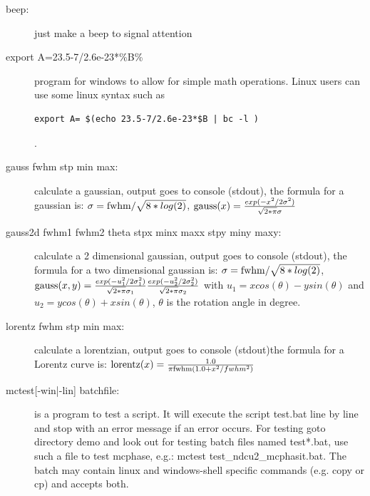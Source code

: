 \begin{description}
\item [\prg beep:] just make a beep to signal attention 
\item [\prg export A=23.5-7/2.6e-23*\%B\%] program for windows to allow for
simple math operations. Linux users can use some linux syntax such as 
{\prg \begin{verbatim}export A= $(echo 23.5-7/2.6e-23*$B | bc -l )\end{verbatim}}.
\item [\prg gauss\label{gauss} fwhm stp min max:] calculate a gaussian, output goes to console %
(stdout), the formula for a gaussian is:
$\sigma={\rm fwhm}/\sqrt{8*log(2)}$,
${\rm gauss}(x)=\frac{exp(-x^2/2 \sigma^2)}{\sqrt{2*\pi}\sigma}$
\item [\prg gauss2d\label{gauss2d} fwhm1 fwhm2 theta  stpx minx maxx stpy miny maxy:] calculate a 2 dimensional gaussian, output goes to console %
(stdout), the formula for a two dimensional gaussian is:
$\sigma={\rm fwhm}/\sqrt{8*log(2)}$,
${\rm gauss}(x,y)=\frac{exp(-u_1^2/2 \sigma_1^2)}{\sqrt{2*\pi}\sigma_1}\frac{exp(-u_2^2/2 \sigma_2^2)}{\sqrt{2*\pi}\sigma_2}$ with $u_1=x cos(\theta)-ysin(\theta)$ and $u_2=y cos(\theta)+xsin(\theta)$,
$\theta$ is the rotation angle in degree.
\item [\prg lorentz\label{lorentz} fwhm stp min max:] calculate a lorentzian, output goes to %
console (stdout)the formula for a Lorentz curve is: 
${\rm lorentz}(x)=\frac{1.0}{\pi{\rm fwhm}(1.0+x^2/fwhm^2)}$
\item [\prg mctest\label{mctest}{[-win|-lin]} batchfile:] is a program to test a script. It
 will execute the script test.bat line by line and stop with an error message
if an error occurs. For testing  goto directory demo and look out for testing batch files
named test*.bat, use such a file to test mcphase, e.g.:
{\prg mctest test\_ndcu2\_mcphasit.bat}. The batch may contain linux and windows-shell specific
commands (e.g. copy or cp) and accepts both. 


\end{description}
